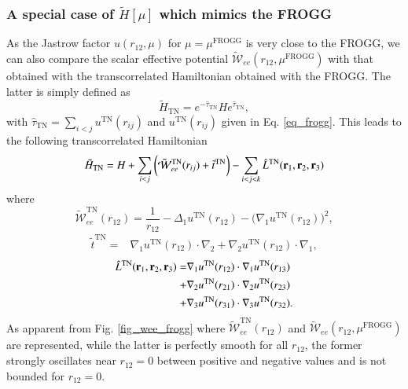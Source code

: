 \documentclass[aip,jcp,reprint,noshowkeys,superscriptaddress,twocolumn]{revtex4-1}
\newcommand{\bri}[1]{{\bf r}_{#1}}
\newcommand{\mfrogg}[0]{\mu^\text{FROGG}}
\begin{document}
\subsubsection{A special case of $\tilde{H}[\mu]$ which mimics the FROGG}
As the Jastrow factor $u(r_{12},\mu)$ for $\mu=\mfrogg$ is very close to the FROGG, we can also compare the scalar effective potential $\tilde{\mathcal{W}}_{ee}(r_{12},\mfrogg)$ with that obtained with the transcorrelated Hamiltonian obtained with the FROGG. 
The latter is simply defined as 
\begin{equation}
 \label{eq:tn_htilde}
 \tilde{H}_{\text{TN}} = e^{-\hat{\tau}_{\text{TN}}}H e^{\hat{\tau}_{\text{TN}}},
\end{equation}
with $\hat{\tau}_{\text{TN}} = \sum_{i<j} u^\text{TN}(r_{ij})$ and $u^\text{TN}(r_{ij})$ given in Eq. \eqref{eq_frogg}. 
This leads to the following transcorrelated Hamiltonian 
\begin{equation}
 \label{eq:tn_htilde_2}
  \tilde{H}_{\text{TN}} = H + \sum_{i<j} \bigg( \tilde{\mathcal{W}}^\text{TN}_{ee}(r_{ij}) + \tilde{t}^\text{TN} \bigg) - \sum_{i<j<k} \hat{L}^\text{TN}(\bri{1},\bri{2},\bri{3})
\end{equation}
where 
\begin{equation}
 \label{eq:_wee_frogg}
 \tilde{\mathcal{W}}_{ee}^\text{TN}(r_{12})= \frac{1}{r_{12}}-\Delta_1 u^{\text{TN}}(r_{12}) - \big(\nabla_1 u^{\text{TN}}(r_{12}) \big) ^2, 
\end{equation}
\begin{equation}
 \begin{aligned}
 \tilde{t}^\text{TN} = &\nabla_1 u^\text{TN}(r_{12}) \cdot \nabla_2 + \nabla_2 u^\text{TN}(r_{12})\cdot \nabla_1,
 \end{aligned}
\end{equation}
\begin{equation}
 \begin{aligned}
 \label{def_k}
  \hat{L}^{\text{TN}}(\bri{1},\bri{2},\bri{3})  = & \nabla_1 u^\text{TN}(r_{12}) \cdot \nabla_1 u^\text{TN}(r_{13}) \\ 
                                     + & \nabla_2 u^\text{TN}(r_{21}) \cdot \nabla_2 u^\text{TN}(r_{23})  \\
                                     + & \nabla_3 u^\text{TN}(r_{31}) \cdot \nabla_3 u^\text{TN}(r_{32}).
 \end{aligned}
\end{equation}
As apparent from Fig. \ref{fig_wee_frogg} where $\tilde{\mathcal{W}}_{ee}^\text{TN}(r_{12})$ and $\tilde{\mathcal{W}}_{ee}(r_{12},\mfrogg)$ are represented, while the latter is perfectly smooth for all $r_{12}$, the former strongly oscillates near $r_{12}=0$ between positive and negative values and is not bounded for $r_{12}=0$. 
\end{document}
